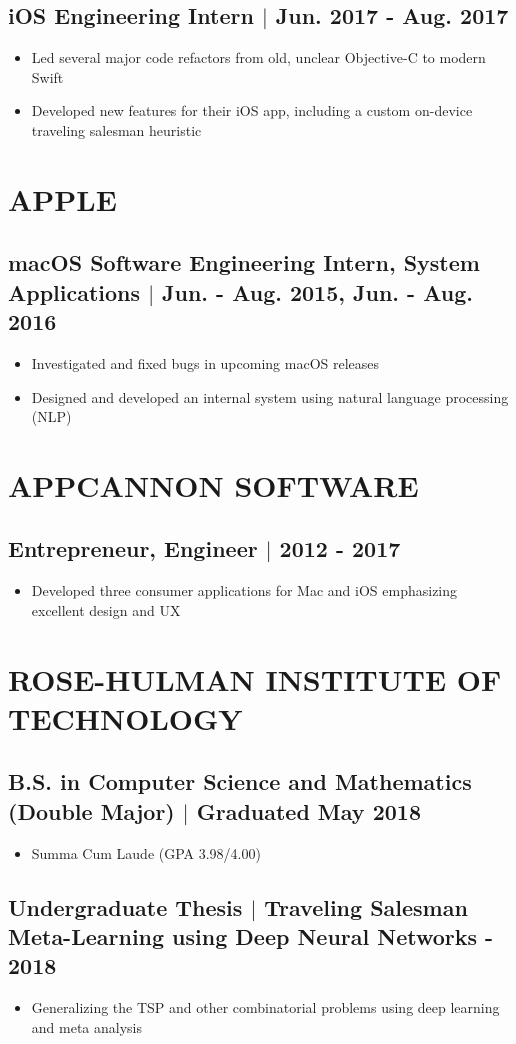 \documentclass[10pt]{article}
\begin{document}
\subsection{iOS Engineering Intern $\vert$ Jun. 2017 - Aug. 2017}
\begin{itemize}
    \item Led several major code refactors from old, unclear Objective-C to modern Swift
    \item Developed new features for their iOS app, including a custom on-device traveling salesman heuristic
\end{itemize}

\section{APPLE}
\subsection{macOS Software Engineering Intern, System Applications $\vert$ Jun. - Aug. 2015, Jun. - Aug. 2016}
\begin{itemize}
    \item Investigated and fixed bugs in upcoming macOS releases
    \item Designed and developed an internal system using natural language processing (NLP)
\end{itemize}

\section{APPCANNON SOFTWARE}
\subsection{Entrepreneur, Engineer $\vert$ 2012 - 2017}
\begin{itemize}
    \item Developed three consumer applications for Mac and iOS emphasizing excellent design and UX
\end{itemize}


\section{ROSE-HULMAN INSTITUTE OF TECHNOLOGY}
\subsection{B.S. in Computer Science and Mathematics (Double Major) $\vert$ Graduated May 2018}
\begin{itemize}
    \item Summa Cum Laude (GPA 3.98/4.00)
\end{itemize}

\subsection{Undergraduate Thesis $\vert$ Traveling Salesman Meta-Learning using Deep Neural Networks - 2018}
\begin{itemize}
    \item Generalizing the TSP and other combinatorial problems using deep learning and meta analysis
\end{itemize}
\end{document}

